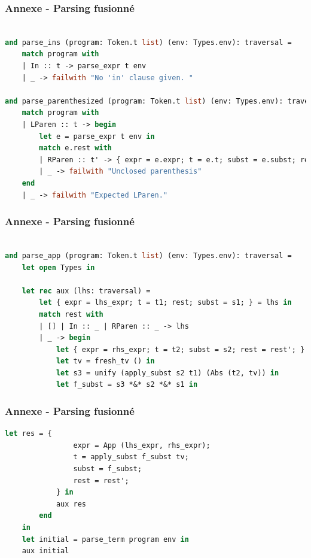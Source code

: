 \documentclass{beamer}
\begin{document}
\begin{frame}[fragile]
		\frametitle{Annexe - Parsing fusionné}
		\begin{lstlisting}[language=ML]
				
and parse_ins (program: Token.t list) (env: Types.env): traversal =
    match program with
    | In :: t -> parse_expr t env
    | _ -> failwith "No 'in' clause given. "

and parse_parenthesized (program: Token.t list) (env: Types.env): traversal =
    match program with
    | LParen :: t -> begin
        let e = parse_expr t env in
        match e.rest with
        | RParen :: t' -> { expr = e.expr; t = e.t; subst = e.subst; rest = t'; }
        | _ -> failwith "Unclosed parenthesis"
    end
    | _ -> failwith "Expected LParen."
		\end{lstlisting}
	
\end{frame}
\begin{frame}[fragile]
		\frametitle{Annexe - Parsing fusionné}
		\begin{lstlisting}[language=ML]
			
and parse_app (program: Token.t list) (env: Types.env): traversal = 
    let open Types in

    let rec aux (lhs: traversal) = 
        let { expr = lhs_expr; t = t1; rest; subst = s1; } = lhs in
        match rest with
        | [] | In :: _ | RParen :: _ -> lhs
        | _ -> begin
            let { expr = rhs_expr; t = t2; subst = s2; rest = rest'; } = parse_term rest env in
            let tv = fresh_tv () in
            let s3 = unify (apply_subst s2 t1) (Abs (t2, tv)) in 
            let f_subst = s3 *&* s2 *&* s1 in

		\end{lstlisting}
	
\end{frame}
\begin{frame}[fragile]
		\frametitle{Annexe - Parsing fusionné}
		\begin{lstlisting}[language=ML]
		   let res = {
                expr = App (lhs_expr, rhs_expr);
                t = apply_subst f_subst tv; 
                subst = f_subst;
                rest = rest';
            } in
            aux res
        end
    in 
    let initial = parse_term program env in
    aux initial
			
		\end{lstlisting}
	
\end{frame}
\end{document}

